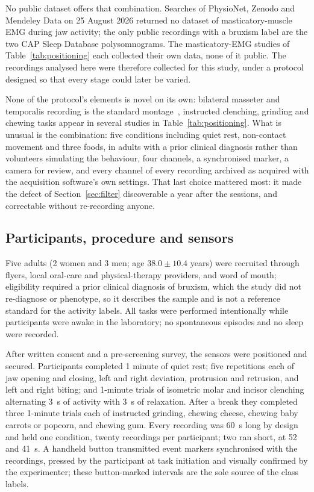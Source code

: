 \documentclass[pdflatex,sn-nature,iicol]{sn-jnl}
\begin{document}
No public dataset offers that combination. Searches of PhysioNet, Zenodo and Mendeley Data on 25 August 2026 returned no dataset of masticatory-muscle EMG during jaw activity; the only public recordings with a bruxism label are the two CAP Sleep Database polysomnograms. The masticatory-EMG studies of Table~\ref{tab:positioning} each collected their own data, none of it public. The recordings analysed here were therefore collected for this study, under a protocol designed so that every stage could later be varied.

None of the protocol's elements is novel on its own: bilateral masseter and temporalis recording is the standard montage~\cite{ferrario2000electromyographic,castroflorio2005reproducibility}, instructed clenching, grinding and chewing tasks appear in several studies in Table~\ref{tab:positioning}. What is unusual is the combination: five conditions including quiet rest, non-contact movement and three foods, in adults with a prior clinical diagnosis rather than volunteers simulating the behaviour, four channels, a synchronised marker, a camera for review, and every channel of every recording archived as acquired with the acquisition software's own settings. That last choice mattered most: it made the defect of Section~\ref{sec:filter} discoverable a year after the sessions, and correctable without re-recording anyone.

\subsection{Participants, procedure and sensors}

Five adults (2 women and 3 men; age $38.0 \pm 10.4$ years) were recruited through flyers, local oral-care and physical-therapy providers, and word of mouth; eligibility required a prior clinical diagnosis of bruxism, which the study did not re-diagnose or phenotype, so it describes the sample and is not a reference standard for the activity labels. All tasks were performed intentionally while participants were awake in the laboratory; no spontaneous episodes and no sleep were recorded.

After written consent and a pre-screening survey, the sensors were positioned and secured. Participants completed 1 minute of quiet rest; five repetitions each of jaw opening and closing, left and right deviation, protrusion and retrusion, and left and right biting; and 1-minute trials of isometric molar and incisor clenching alternating 3~s of activity with 3~s of relaxation. After a break they completed three 1-minute trials each of instructed grinding, chewing cheese, chewing baby carrots or popcorn, and chewing gum. Every recording was 60~s long by design and held one condition, twenty recordings per participant; two ran short, at 52 and 41~s. A handheld button transmitted event markers synchronised with the recordings, pressed by the participant at task initiation and visually confirmed by the experimenter; these button-marked intervals are the sole source of the class labels.
\end{document}

